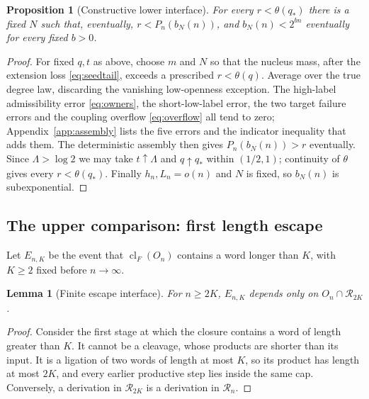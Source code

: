 \documentclass[11pt,letterpaper]{article}
\theoremstyle{plain}
\newtheorem{proposition}[theorem]{Proposition}
\newtheorem{lemma}[theorem]{Lemma}
\theoremstyle{definition}
\theoremstyle{remark}
\numberwithin{equation}{section}
\newcommand{\RR}{\mathcal R}
\newcommand{\cl}{\operatorname{cl}}
\newcommand{\thetaq}{\theta(q_*)}
\begin{document}
\begin{proposition}[Constructive lower interface]\label{prop:lower}
For every $r<\thetaq$ there is a fixed $N$ such that, eventually, $r<P_n(b_N(n))$, and $b_N(n)<2^{bn}$ eventually for every fixed $b>0$.
\end{proposition}
\begin{proof}
For fixed $q,t$ as above, choose $m$ and $N$ so that the nucleus mass, after the extension loss \eqref{eq:seedtail}, exceeds a prescribed $r<\theta(q)$. Average over the true degree law, discarding the vanishing low-openness exception. The high-label admissibility error \eqref{eq:owners}, the short-low-label error, the two target failure errors and the coupling overflow \eqref{eq:overflow} all tend to zero; Appendix~\ref{app:assembly} lists the five errors and the indicator inequality that adds them. The deterministic assembly then gives $P_n(b_N(n))>r$ eventually. Since $\Lambda>\log2$ we may take $t\uparrow\Lambda$ and $q\uparrow q_*$ within $(1/2,1)$; continuity of $\theta$ gives every $r<\thetaq$. Finally $h_n,L_n=o(n)$ and $N$ is fixed, so $b_N(n)$ is subexponential.
\end{proof}

\subsection{The upper comparison: first length escape}
Let $E_{n,K}$ be the event that $\cl_F(O_n)$ contains a word longer than $K$, with $K\ge2$ fixed before $n\to\infty$.

\begin{lemma}[Finite escape interface]\label{lem:escape}
For $n\ge2K$, $E_{n,K}$ depends only on $O_n\cap\RR_{2K}$.
\end{lemma}
\begin{proof}
Consider the first stage at which the closure contains a word of length greater than $K$. It cannot be a cleavage, whose products are shorter than its input. It is a ligation of two words of length at most $K$, so its product has length at most $2K$, and every earlier productive step lies inside the same cap. Conversely, a derivation in $\RR_{2K}$ is a derivation in $\RR_n$.
\end{proof}
\end{document}
